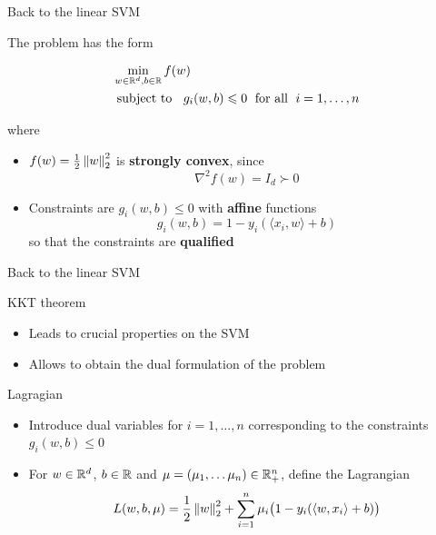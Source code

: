 \documentclass[xcolor={usenames,dvipsnames}]{beamer}
\begin{document}
\begin{frame}{Back to the linear SVM}

The problem has the form
\begin{block}{}
\begin{align*}
  &\min_{w \in \mathbb{R}^d, b \in \mathbb{R}} f(w) \\
  &\text{ subject to } \;\;  g_i(w, b) \leqslant 0 \; \text{ for all } 
  \;i=1, \ldots, n
\end{align*}
\end{block}
where
\begin{itemize}
  \item $f(w) = \frac 12 \left\| w \right\|_2^2$ is \textbf{strongly convex}, since
  \begin{equation*}
      \nabla^2 f(w) = I_d \succ 0    
  \end{equation*}
  \item Constraints are $g_i(w, b) \leq 0$ with \textbf{affine} functions
  \begin{equation*}
    g_i(w, b) =  1 - y_i (\langle {x_i, w} \rangle  + b)
  \end{equation*}
  so that the constraints are \textbf{qualified}
\end{itemize}
\end{frame}

\begin{frame}{Back to the linear SVM}




KKT theorem 
  \begin{itemize}
    \item Leads to crucial properties on the SVM
    \item Allows to obtain the dual formulation of the problem
  \end{itemize}

  \bigskip
  \begin{block}{Lagragian}
  \begin{itemize}
    \item Introduce dual variables  for $i=1, \ldots, n$ corresponding to the constraints $g_i(w, b) \leq 0$
    \item For $w \in \mathbb{R}^d$, $b \in \mathbb{R}$ and $\mu = (\mu_1, \ldots \mu_n) \in \mathbb{R}_+^n$, define the Lagrangian
    \begin{equation*}
      L(w, b, \mu) = \frac 12 \left\| w \right\|_2^2 + \sum_{i=1}^n \mu_i \big(1 - y_i( \langle {w, x_i} \rangle  + b) \big)
    \end{equation*}
  \end{itemize}
  \end{block}
  
  \end{frame}
\end{document}
